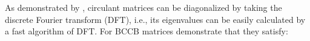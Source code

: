 \documentclass[manuscript,revised]{geophysics}
\begin{document}



%
%
%
%

As demonstrated by \cite{grenander-szego1984}, circulant matrices can be diagonalized by taking the discrete Fourier transform (DFT), i.e., its eigenvalues can be easily calculated by a fast algorithm of DFT. For BCCB matrices \cite{chan-jin2007} demonstrate that they satisfy:
\end{document}
